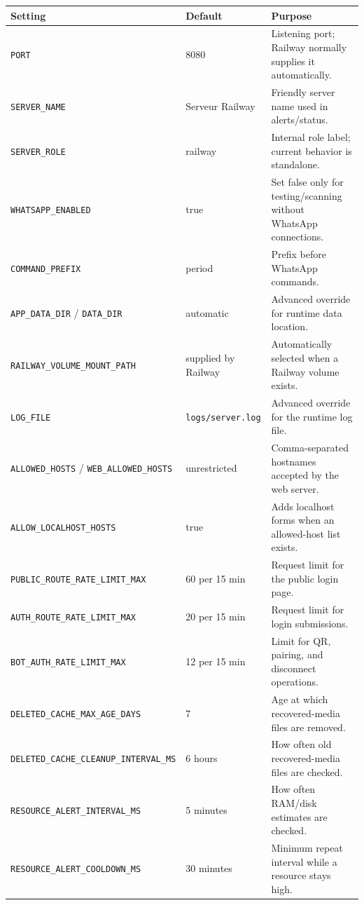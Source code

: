 \documentclass[11pt,a4paper]{article}
\begin{document}
\begin{longtable}{p{}p{}p{}}
\toprule
\textbf{Setting} & \textbf{Default} & \textbf{Purpose}\\
\midrule
\endhead
\texttt{PORT} & 8080 & Listening port; Railway normally supplies it automatically.\\
\texttt{SERVER\_NAME} & Serveur Railway & Friendly server name used in alerts/status.\\
\texttt{SERVER\_ROLE} & railway & Internal role label; current behavior is standalone.\\
\texttt{WHATSAPP\_ENABLED} & true & Set false only for testing/scanning without WhatsApp connections.\\
\texttt{COMMAND\_PREFIX} & period & Prefix before WhatsApp commands.\\
\texttt{APP\_DATA\_DIR} / \texttt{DATA\_DIR} & automatic & Advanced override for runtime data location.\\
\texttt{RAILWAY\_VOLUME\_MOUNT\_PATH} & supplied by Railway & Automatically selected when a Railway volume exists.\\
\texttt{LOG\_FILE} & \texttt{logs/server.log} & Advanced override for the runtime log file.\\
\texttt{ALLOWED\_HOSTS} / \texttt{WEB\_ALLOWED\_HOSTS} & unrestricted & Comma-separated hostnames accepted by the web server.\\
\texttt{ALLOW\_LOCALHOST\_HOSTS} & true & Adds localhost forms when an allowed-host list exists.\\
\nolinkurl{PUBLIC_ROUTE_RATE_LIMIT_MAX} & 60 per 15 min & Request limit for the public login page.\\
\texttt{AUTH\_ROUTE\_RATE\_LIMIT\_MAX} & 20 per 15 min & Request limit for login submissions.\\
\texttt{BOT\_AUTH\_RATE\_LIMIT\_MAX} & 12 per 15 min & Limit for QR, pairing, and disconnect operations.\\
\texttt{DELETED\_CACHE\_MAX\_AGE\_DAYS} & 7 & Age at which recovered-media files are removed.\\
\nolinkurl{DELETED_CACHE_CLEANUP_INTERVAL_MS} & 6 hours & How often old recovered-media files are checked.\\
\texttt{RESOURCE\_ALERT\_INTERVAL\_MS} & 5 minutes & How often RAM/disk estimates are checked.\\
\texttt{RESOURCE\_ALERT\_COOLDOWN\_MS} & 30 minutes & Minimum repeat interval while a resource stays high.\\

\end{longtable}
\end{document}
